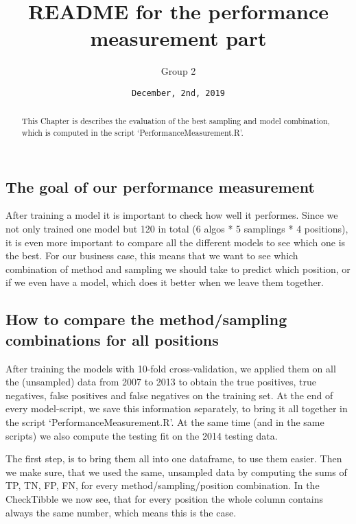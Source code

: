 \documentclass[]{article}
\title{README for the performance measurement part}
\author{Group 2}
\date{\texttt{December,\ 2nd,\ 2019}}
\begin{document}
\maketitle
\begin{abstract}
This Chapter is describes the evaluation of the best sampling and model
combination, which is computed in the script `PerformanceMeasurement.R'.
\end{abstract}

\hypertarget{the-goal-of-our-performance-measurement}{%
\subsection{The goal of our performance
measurement}\label{the-goal-of-our-performance-measurement}}

After training a model it is important to check how well it performes.
Since we not only trained one model but 120 in total (6 algos * 5
samplings * 4 positions), it is even more important to compare all the
different models to see which one is the best. For our business case,
this means that we want to see which combination of method and sampling
we should take to predict which position, or if we even have a model,
which does it better when we leave them together.

\hypertarget{how-to-compare-the-methodsampling-combinations-for-all-positions}{%
\subsection{How to compare the method/sampling combinations for all
positions}\label{how-to-compare-the-methodsampling-combinations-for-all-positions}}

After training the models with 10-fold cross-validation, we applied them
on all the (unsampled) data from 2007 to 2013 to obtain the true
positives, true negatives, false positives and false negatives on the
training set. At the end of every model-script, we save this information
separately, to bring it all together in the script
`PerformanceMeasurement.R'. At the same time (and in the same scripts)
we also compute the testing fit on the 2014 testing data.

The first step, is to bring them all into one dataframe, to use them
easier. Then we make sure, that we used the same, unsampled data by
computing the sums of TP, TN, FP, FN, for every method/sampling/position
combination. In the CheckTibble we now see, that for every position the
whole column contains always the same number, which means this is the
case.
\end{document}
